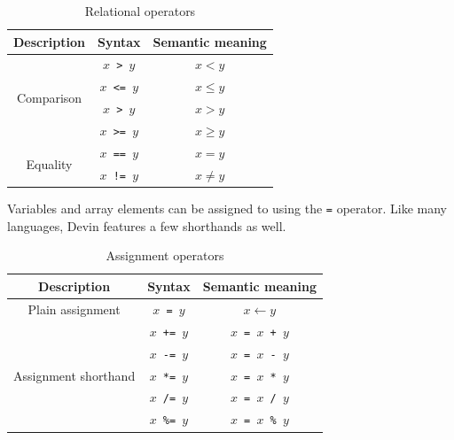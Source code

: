\documentclass[UdineBachThesis,american,11pt]{PhdThesis}
\begin{document}
  \begin{table}[H]
    \centering

    \begin{tabular}{|c|c|c|}
      \hline

      Description &
      Syntax &
      Semantic meaning \\
      \hline

      \multirow{4}{*}{Comparison} &
      \texttt{$x$ > $y$} &
      $x < y$ \\

      &
      \texttt{$x$ <= $y$} &
      $x \leq y$ \\

      &
      \texttt{$x$ > $y$} &
      $x > y$ \\

      &
      \texttt{$x$ >= $y$} &
      $x \geq y$ \\

      \multirow{2}{*}{Equality} &
      \texttt{$x$ == $y$} &
      $x = y$ \\

      &
      \texttt{$x$ != $y$} &
      $x \neq y$ \\
      \hline
    \end{tabular}

    \caption{Relational operators}
  \end{table}

  Variables and array elements can be assigned to using the \texttt{=} operator.
  Like many languages, Devin features a few shorthands as well.

  \begin{table}[H]
    \centering

    \begin{tabular}{|c|c|c|}
      \hline

      Description &
      Syntax &
      Semantic meaning \\
      \hline

      Plain assignment &
      \texttt{$x$ = $y$} &
      $x \leftarrow y$ \\

      \multirow{5}{*}{Assignment shorthand} &
      \texttt{$x$ += $y$} &
      \texttt{$x$ = $x$ + $y$} \\

      &
      \texttt{$x$ -= $y$} &
      \texttt{$x$ = $x$ - $y$} \\

      &
      \texttt{$x$ *= $y$} &
      \texttt{$x$ = $x$ * $y$} \\

      &
      \texttt{$x$ /= $y$} &
      \texttt{$x$ = $x$ / $y$} \\

      &
      \texttt{$x$ \%= $y$} &
      \texttt{$x$ = $x$ \% $y$} \\
      \hline
    \end{tabular}

    \caption{Assignment operators}
    \label{table:assignment-operators}
  \end{table}
\end{document}
